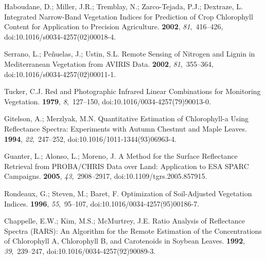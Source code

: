 \documentclass[remotesensing,article,accept,moreauthors,pdftex]{Definitions/mdpi}
\begin{document}
\begin{thebibliography}{999}
Haboudane, D.; Miller, J.R.; Tremblay, N.; {Zarco-Tejada}, P.J.; Dextraze, L.
\newblock Integrated Narrow-Band Vegetation Indices for Prediction of Crop
  Chlorophyll Content for Application to Precision Agriculture.
 {\bf 2002}, {\em 81},~416--426, doi:10.1016/s0034-4257(02)00018-4.

Serrano, L.; Pe{\~n}uelas, J.; Ustin, S.L.
\newblock Remote Sensing of Nitrogen and Lignin in {{Mediterranean}} Vegetation
  from {{AVIRIS}} Data.
 {\bf 2002}, {\em 81},~355--364, doi:10.1016/s0034-4257(02)00011-1.

Tucker, C.J.
\newblock Red and Photographic Infrared Linear Combinations for Monitoring
  Vegetation.
 {\bf 1979}, {\em 8},~127--150, doi:10.1016/0034-4257(79)90013-0.

Gitelson, A.; Merzlyak, M.N.
\newblock Quantitative Estimation of Chlorophyll-a Using Reflectance Spectra:
  Experiments with Autumn Chestnut and Maple Leaves.
 {\bf
  1994}, {\em 22},~247--252, doi:10.1016/1011-1344(93)06963-4.

Guanter, L.; Alonso, L.; Moreno, J.
\newblock A Method for the Surface Reflectance Retrieval from
  {{PROBA}}/{{CHRIS}} Data over Land: Application to {{ESA SPARC}} Campaigns.
 {\bf 2005},
  {\em 43},~2908--2917, doi:10.1109/tgrs.2005.857915.

Rondeaux, G.; Steven, M.; Baret, F.
\newblock Optimization of Soil-Adjusted Vegetation Indices.
 {\bf 1996}, {\em 55},~95--107, doi:10.1016/0034-4257(95)00186-7.

Chappelle, E.W.; Kim, M.S.; McMurtrey, J.E.
\newblock Ratio Analysis of Reflectance Spectra ({{RARS}}): An Algorithm for
  the Remote Estimation of the Concentrations of Chlorophyll {{A}}, Chlorophyll
  {{B}}, and Carotenoids in Soybean Leaves.
 {\bf 1992}, {\em 39},~239--247, doi:10.1016/0034-4257(92)90089-3.


\end{thebibliography}
\end{document}
